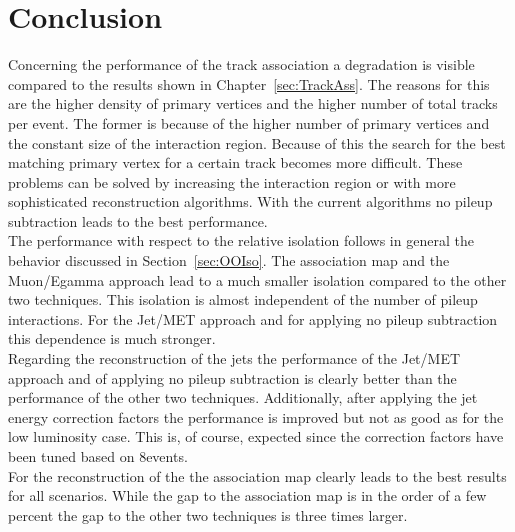 \section{Conclusion}

Concerning the performance of the track association a degradation is visible compared to the results shown in Chapter~\ref{sec:TrackAss}. The reasons for this are the higher density of primary vertices and the higher number of total tracks per event. The former is because of the higher number of primary vertices and the constant size of the interaction region. Because of this the search for the best matching primary vertex for a certain track becomes more difficult. These problems can be solved by increasing the interaction region or with more sophisticated reconstruction algorithms. With the current algorithms no pileup subtraction leads to the best performance. \\
The performance with respect to the relative isolation follows in general the behavior discussed in Section~\ref{sec:OOIso}. The association map and the Muon/Egamma approach lead to a much smaller isolation compared to the other two techniques. This isolation is almost independent of the number of pileup interactions. For the Jet/MET approach and for applying no pileup subtraction this dependence is much stronger. \\
Regarding the reconstruction of the jets the performance of the Jet/MET approach and of applying no pileup subtraction is clearly better than the performance of the other two techniques. Additionally, after applying the jet energy correction factors the performance is improved but not as good as for the low luminosity case. This is, of course, expected since the correction factors have been tuned based on 8\TeV events. \\
For the reconstruction of the \MET{} the association map clearly leads to the best results for all scenarios. While the gap to the association map is in the order of a few percent the gap to the other two techniques is three times larger.
